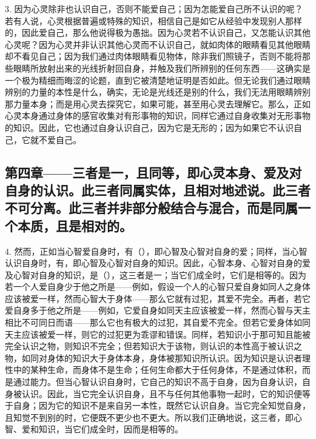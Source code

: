 3. 因为心灵除非也认识自己，否则不能爱自己；因为怎能爱自己所不认识的呢？若有人说，心灵根据普遍或特殊的知识，相信自己是如它从经验中发现别人那样的，因此爱自己，那么他说得极为愚拙。因为心灵若不认识自己，又怎能认识其他心灵呢？因为心灵并非认识其他心灵而不认识自己，就如肉体的眼睛看见其他眼睛却不看见自己；因为我们通过肉体眼睛看见物体，除非我们照镜子，否则不能将那些眼睛所放射出来的光线折射回自身，并触及我们所辨别的任何东西——这确实是一个极为精细而晦涩的论题，直到它被清楚地证明是否如此。但无论我们通过眼睛辨别的力量的本性是什么，确实，无论是光线还是别的什么，我们无法用眼睛辨别那力量本身；而是用心灵去探究它，如果可能，甚至用心灵去理解它。那么，正如心灵本身通过身体的感官收集对有形事物的知识，同样它通过自身收集对无形事物的知识。因此，它也通过自身认识自己，因为它是无形的；因为如果它不认识自己，它就不爱自己。\par


\subsection{第四章——三者是一，且同等，即心灵本身、爱及对自身的认识。此三者同属实体，且相对地述说。此三者不可分离。此三者并非部分般结合与混合，而是同属一个本质，且是相对的。}

4. 然而，正如当心智爱自身时，有（），即心智及心智对自身的爱；同样，当心智认识自身时，有，即心智及心智对自身的知识。因此，心智本身、心智对自身的爱及心智对自身的知识，是（），这三者是一；当它们成全时，它们是相等的。因为若一个人爱自身少于他之所是——例如，假设一个人的心智只爱自身如同人之身体应该被爱一样，然而心智大于身体——那么它就有过犯，其爱不完全。再者，若它爱自身多于他之所是——例如，它爱自身如同天主应该被爱一样，然而心智与天主相比不可同日而语——那么它也有极大的过犯，其自爱不完全。但若它爱身体如同天主应该被爱一样，则它的过犯更为乖谬和错误。同样，若知识小于那可知且能被完全认识之物，则知识不完全；但若知识大于该物，则认识的本性高于被认识之物，如同对身体的知识大于身体本身，身体被那知识所认识。因为知识是认识者理性中的某种生命，而身体不是生命；任何生命都大于任何身体，不是通过体积，而是通过能力。但当心智认识自身时，它自己的知识不高于自身，因为自身认识，自身被认识。因此，当它完全认识自身，且不与任何其他事物一起时，它的知识便等于自身；因为它的知识不是来自另一本性，既然它认识自身。当它完全知觉自身，且知觉不到别的时，它便既不更少也不更大。所以我们正确地说，这三者，即心智、爱和知识，当它们成全时，因而是相等的。\par

